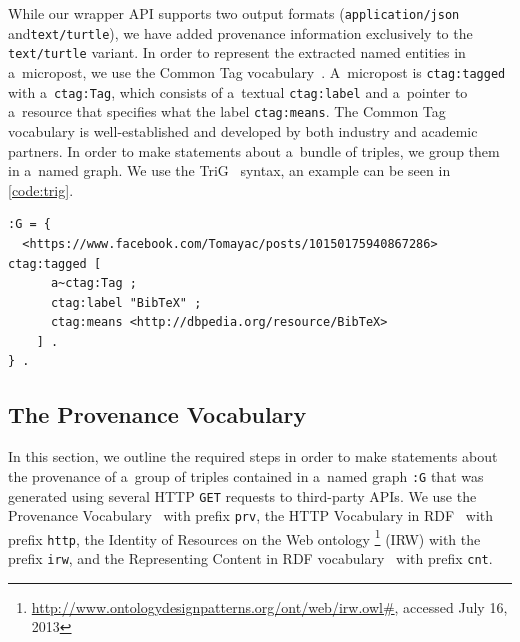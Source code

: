 While our wrapper API supports two output formats
(\texttt{application/json} and\linebreak \texttt{text/turtle}),
we have added provenance information exclusively to the
\texttt{text/turtle} variant.
In order to represent the extracted named entities in a~micropost,
we use the Common Tag vocabulary~\cite{tori2009commontag}.
A~micropost is \texttt{ctag:tagged} with a~\texttt{ctag:Tag},
which consists of a~textual \texttt{ctag:label} and a~pointer
to a~resource that specifies what the label \texttt{ctag:means}.
The Common Tag vocabulary is well-established and developed by
both industry and academic partners.
In order to make statements about a~bundle of triples,
we group them in a~named graph.
We use the TriG~\cite{bizer2007trig} syntax,
an example can be seen in \autoref{code:trig}.

\begin{lstlisting}[caption={Example named graph in TriG syntax},
  label={code:trig}]
:G = {
  <https://www.facebook.com/Tomayac/posts/10150175940867286> ctag:tagged [
      a~ctag:Tag ;
      ctag:label "BibTeX" ;
      ctag:means <http://dbpedia.org/resource/BibTeX>
    ] .
} .
\end{lstlisting}

\subsection{The Provenance Vocabulary}
\label{sec:provenance}

In this section, we outline the required steps
in order to make statements about the provenance
of a~group of triples contained in a~named graph
\texttt{:G} that was generated using several HTTP \texttt{GET}
requests to third-party APIs.
We use the Provenance Vocabulary~\cite{hartig2012provenance} with
prefix \texttt{prv}, the HTTP Vocabulary in RDF~\cite{koch2011http}
with prefix \texttt{http},
the Identity of Resources on the Web ontology%
\footnote{\url{http://www.ontologydesignpatterns.org/ont/web/irw.owl\#},
accessed July 16, 2013} (IRW)
with the prefix \texttt{irw},
and the Representing Content in RDF
vocabulary~\cite{koch2011content} with prefix \texttt{cnt}.

